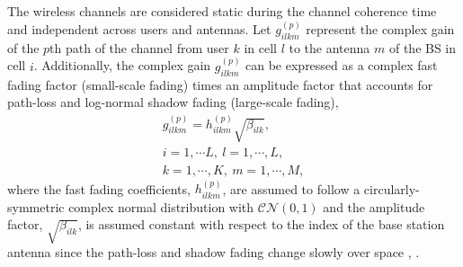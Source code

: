 \documentclass[10pt,journal,comsoc,final]{IEEEtran}
\begin{document}
The wireless channels are considered static during the channel coherence time and independent across users and antennas. Let $g_{ilkm}^{(p)}$ represent the complex gain of the $p$th path of the channel from user $k$ in cell $l$ to the antenna $m$ of the BS in cell $i$. Additionally, the complex gain $g_{ilkm}^{(p)}$ can be expressed as a complex fast fading factor (small-scale fading) times an amplitude factor that accounts for path-loss and log-normal shadow fading (large-scale fading),
\begin{equation}
\begin{split}
g_{ilkm}^{(p)} = h_{ilkm}^{(p)}\sqrt{\beta_{ilk}}, 
\\ i = 1, \cdots L, \ l = 1, \cdots, L, 
\\ k = 1, \cdots, K, \ m = 1, \cdots, M,
\end{split}
\end{equation}
where the fast fading coefficients, $h_{ilkm}^{(p)}$, are assumed to follow a circularly-symmetric complex normal distribution with $\mathcal{CN}(0,1)$ and the amplitude factor, $\sqrt{\beta_{ilk}}$, is assumed constant with respect to the index of the base station
antenna since the path-loss and shadow fading change slowly
over space \cite{marzetta:noncooperative},  \cite{sklar:rayleigh_channels,tranter:principles}. 
\end{document}
